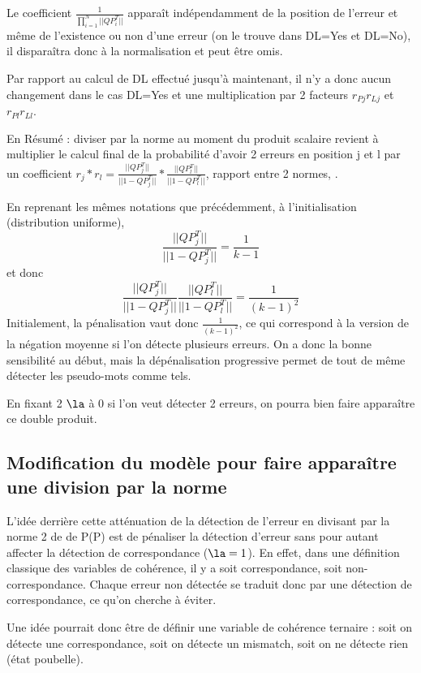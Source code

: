 \documentclass{article}
\begin{document}
     Le coefficient $\frac{1}{\prod_{i=1}^{N} ||QP_i^T||}$ apparaît indépendamment de la position de l'erreur et même de l'existence ou non d'une erreur (on le trouve dans DL=Yes et DL=No), il disparaîtra donc à la normalisation et peut être omis.
     
     Par rapport au calcul de DL effectué jusqu'à maintenant, il n'y a donc aucun changement dans le cas DL=Yes et une multiplication par 2 facteurs $r_{Pj}r_{Lj}$ et $r_{Pl}r_{Ll}$.
     
     En Résumé : diviser par la norme au moment du produit scalaire revient à multiplier le calcul final de la probabilité d'avoir 2 erreurs en position j et l par un coefficient $r_j*r_l=\frac{||QP_j^T|| }{||1-QP_j^T||}*\frac{||QP_l^T|| }{||1-QP_l^T||}$, rapport entre 2 normes, .
     
     
    En reprenant les mêmes notations que précédemment, à l'initialisation (distribution uniforme), 
    $$\frac{||QP_j^T||}{||1-QP_j^T||}=\frac{1}{k-1}$$
    et donc 
    $$\frac{||QP_j^T||}{||1-QP_j^T||}\frac{||QP_l^T||}{||1-QP_l^T||}=\frac{1}{(k-1)^2}$$
    Initialement, la pénalisation vaut donc $\frac{1}{(k-1)^2}$, ce qui correspond à la version de la négation moyenne si l'on détecte plusieurs erreurs.
    On a donc la bonne sensibilité au début, mais la dépénalisation progressive permet de tout de même détecter les pseudo-mots comme tels.
    
    En fixant 2 $\la$ à 0 si l'on veut détecter 2 erreurs, on pourra bien faire apparaître ce double produit.
    

    
    \subsection{Modification du modèle pour faire apparaître une division par la norme}
    
    L'idée derrière cette atténuation de la détection de l'erreur en divisant par la norme 2 de de P(P) est de pénaliser la détection d'erreur sans pour autant affecter la détection de correspondance ($\la=1$). En effet, dans une définition classique des variables de cohérence, il y a soit correspondance, soit non-correspondance. Chaque erreur non détectée se traduit donc par une détection de correspondance, ce qu'on cherche à éviter.
    
    Une idée pourrait donc être de définir une variable de cohérence ternaire : soit on détecte une correspondance, soit on détecte un mismatch, soit on ne détecte rien (état poubelle).
    
\end{document}
